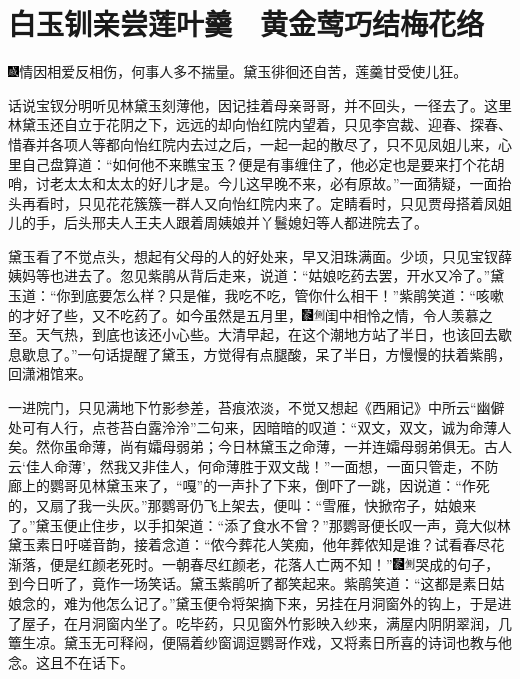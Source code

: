 

\chapter{白玉钏亲尝莲叶羹　黄金莺巧结梅花络}

{\includegraphics[width=3mm]{../Images/00005}情因相爱反相伤，何事人多不揣量。黛玉徘徊还自苦，莲羹甘受使儿狂。}

话说宝钗分明听见林黛玉刻薄他，因记挂着母亲哥哥，并不回头，一径去了。这里林黛玉还自立于花阴之下，远远的却向怡红院内望着，只见李宫裁、迎春、探春、惜春并各项人等都向怡红院内去过之后，一起一起的散尽了，只不见凤姐儿来，心里自己盘算道：``如何他不来瞧宝玉？便是有事缠住了，他必定也是要来打个花胡哨，讨老太太和太太的好儿才是。今儿这早晚不来，必有原故。''一面猜疑，一面抬头再看时，只见花花簇簇一群人又向怡红院内来了。定睛看时，只见贾母搭着凤姐儿的手，后头邢夫人王夫人跟着周姨娘并丫鬟媳妇等人都进院去了。

黛玉看了不觉点头，想起有父母的人的好处来，早又泪珠满面。少顷，只见宝钗薛姨妈等也进去了。忽见紫鹃从背后走来，说道：``姑娘吃药去罢，开水又冷了。''黛玉道：``你到底要怎么样？只是催，我吃不吃，管你什么相干！''紫鹃笑道：``咳嗽的才好了些，又不吃药了。如今虽然是五月里，{\includegraphics[width=3mm]{../Images/00006}\includegraphics[width=3mm]{../Images/00011}\footnotesize \kaishu 闺中相怜之情，令人羡慕之至。}天气热，到底也该还小心些。大清早起，在这个潮地方站了半日，也该回去歇息歇息了。''一句话提醒了黛玉，方觉得有点腿酸，呆了半日，方慢慢的扶着紫鹃，回潇湘馆来。

一进院门，只见满地下竹影参差，苔痕浓淡，不觉又想起《西厢记》中所云``幽僻处可有人行，点苍苔白露泠泠''二句来，因暗暗的叹道：``双文，双文，诚为命薄人矣。然你虽命薄，尚有孀母弱弟；今日林黛玉之命薄，一并连孀母弱弟俱无。古人云`佳人命薄'，然我又非佳人，何命薄胜于双文哉！''一面想，一面只管走，不防廊上的鹦哥见林黛玉来了，``嘎''的一声扑了下来，倒吓了一跳，因说道：``作死的，又扇了我一头灰。''那鹦哥仍飞上架去，便叫：``雪雁，快掀帘子，姑娘来了。''黛玉便止住步，以手扣架道：``添了食水不曾？''那鹦哥便长叹一声，竟大似林黛玉素日吁嗟音韵，接着念道：``侬今葬花人笑痴，他年葬侬知是谁？试看春尽花渐落，便是红颜老死时。一朝春尽红颜老，花落人亡两不知！''{\includegraphics[width=3mm]{../Images/00006}\includegraphics[width=3mm]{../Images/00011}\footnotesize \kaishu 哭成的句子，到今日听了，竟作一场笑话。}黛玉紫鹃听了都笑起来。紫鹃笑道：``这都是素日姑娘念的，难为他怎么记了。''黛玉便令将架摘下来，另挂在月洞窗外的钩上，于是进了屋子，在月洞窗内坐了。吃毕药，只见窗外竹影映入纱来，满屋内阴阴翠润，几簟生凉。黛玉无可释闷，便隔着纱窗调逗鹦哥作戏，又将素日所喜的诗词也教与他念。这且不在话下。

